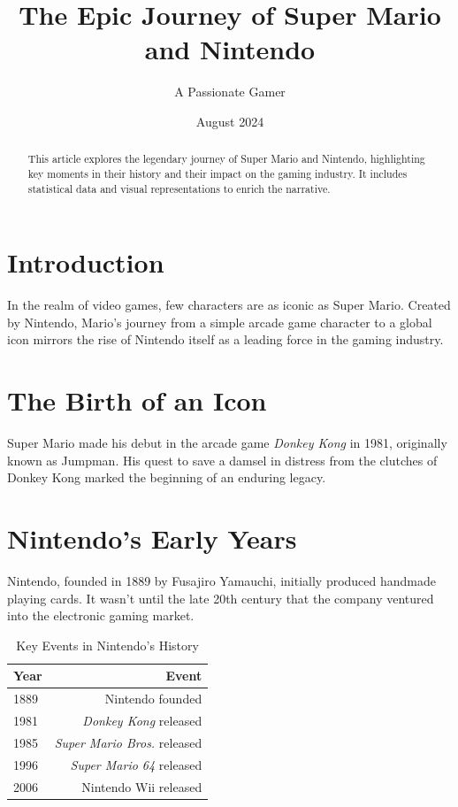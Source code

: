 \documentclass{article}
\title{The Epic Journey of Super Mario and Nintendo}
\author{A Passionate Gamer}
\date{August 2024}
\begin{document}
\maketitle

\begin{abstract}
    This article explores the legendary journey of Super Mario and Nintendo, highlighting key moments in their history and their impact on the gaming industry. It includes statistical data and visual representations to enrich the narrative.
\end{abstract}

\section{Introduction}

In the realm of video games, few characters are as iconic as Super Mario. Created by Nintendo, Mario's journey from a simple arcade game character to a global icon mirrors the rise of Nintendo itself as a leading force in the gaming industry\cite{marioOrigins}.

\section{The Birth of an Icon}

Super Mario made his debut in the arcade game \textit{Donkey Kong} in 1981, originally known as Jumpman\cite{donkeyKong}. His quest to save a damsel in distress from the clutches of Donkey Kong marked the beginning of an enduring legacy.

\section{Nintendo's Early Years}

Nintendo, founded in 1889 by Fusajiro Yamauchi, initially produced handmade playing cards. It wasn't until the late 20th century that the company ventured into the electronic gaming market\cite{nintendoHistory}.

\begin{table}[h]
\centering
\begin{tabular}{|l|r|}
\hline
\textbf{Year} & \textbf{Event} \\
\hline
1889 & Nintendo founded \\
1981 & \textit{Donkey Kong} released \\
1985 & \textit{Super Mario Bros.} released \\
1996 & \textit{Super Mario 64} released \\
2006 & Nintendo Wii released \\
\hline
\end{tabular}
\caption{Key Events in Nintendo's History}
\label{tab:nintendo-history}
\end{table}
\end{document}
